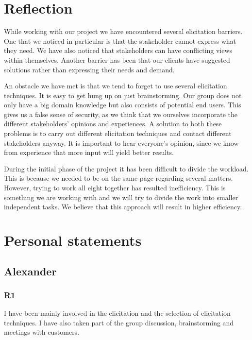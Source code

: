\documentclass[a4paper]{article}
\begin{document}
  \section{Reflection}

While working with our project we have encountered several elicitation barriers. One that we noticed in particular is that the stakeholder cannot express what they need. We have also noticed that stakeholders can have conflicting views within themselves. Another barrier has been that our clients have suggested solutions rather than expressing their needs and demand.

An obstacle we have met is that we tend to forget to use several elicitation techniques. It is easy to get hung up on just brainstorming. Our group does not only have a big domain knowledge but also consists of potential end users. This gives us a false sense of security, as we think that we ourselves incorporate the different stakeholders' opinions and experiences. A solution to both these problems is to carry out different elicitation techniques and contact different stakeholders anyway. It is important to hear everyone's opinion, since we know from experience that more input will yield better results.

During the initial phase of the project it has been difficult to divide the workload. This is because we needed to be on the same page regarding several matters. However, trying to work all eight together has resulted inefficiency. This is something we are working with and we will try to divide the work into smaller independent tasks. We believe that this approach will result in higher efficiency.


  \section{Personal statements}
  
  \subsection{Alexander}
    \subsubsection{R1}
    I have been mainly involved in the elicitation and the selection of elicitation techniques. I have also taken part of the group discussion, brainstorming and meetings with customers.
\end{document}
